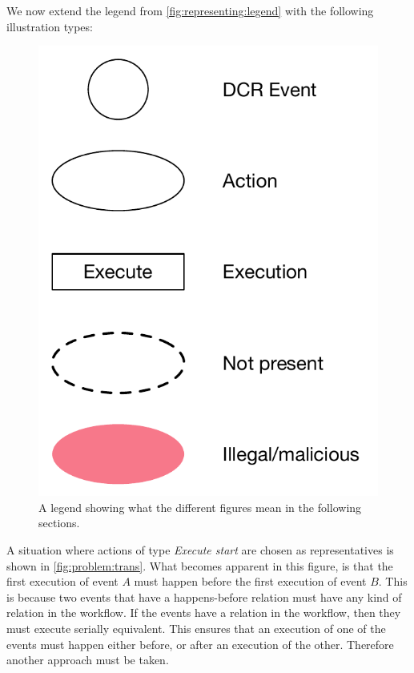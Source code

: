 	\newpar We now extend the legend from \autoref{fig:representing:legend} with the following illustration types:
    
    \begin{figure}[H]
		\centering
		\includegraphics[height=0.25\textheight]{6validation/images/legend-extended.pdf}
		\caption{A legend showing what the different figures mean in the following sections.}
		\label{fig:representing:legend-extended}
	\end{figure}
	
	A situation where actions of type \textit{Execute start} are chosen as representatives is shown in \autoref{fig:problem:trans}. What becomes apparent in this figure, is that the first execution of event $A$ must happen before the first execution of event $B$. This is because two events that have a happens-before relation must have any kind of relation in the workflow. If the events have a relation in the workflow, then they must execute serially equivalent. This ensures that an execution of one of the events must happen either before, or after an execution of the other. Therefore another approach must be taken.
	
